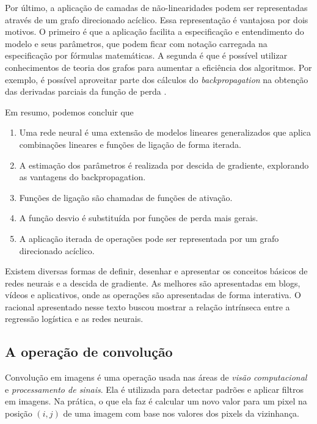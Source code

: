 \documentclass[12pt,]{report}
\providecommand{\tightlist}{%
  \setlength{\itemsep}{0pt}\setlength{\parskip}{0pt}}
\begin{document}
Por último, a aplicação de camadas de não-linearidades podem ser
representadas através de um grafo direcionado acíclico. Essa
representação é vantajosa por dois motivos. O primeiro é que a aplicação
facilita a especificação e entendimento do modelo e seus parâmetros, que
podem ficar com notação carregada na especificação por fórmulas
matemáticas. A segunda é que é possível utilizar conhecimentos de teoria
dos grafos para aumentar a eficiência dos algoritmos. Por exemplo, é
possível aproveitar parte dos cálculos do \emph{backpropagation} na
obtenção das derivadas parciais da função de perda
\citep{abadi2016tensorflow}.

Em resumo, podemos concluir que

\begin{enumerate}
\def\labelenumi{\arabic{enumi}.}
\tightlist
\item
  Uma rede neural é uma extensão de modelos lineares generalizados que
  aplica combinações lineares e funções de ligação de forma iterada.
\item
  A estimação dos parâmetros é realizada por descida de gradiente,
  explorando as vantagens do backpropagation.
\item
  Funções de ligação são chamadas de funções de ativação.
\item
  A função desvio é substituída por funções de perda mais gerais.
\item
  A aplicação iterada de operações pode ser representada por um grafo
  direcionado acíclico.
\end{enumerate}

Existem diversas formas de definir, desenhar e apresentar os conceitos
básicos de redes neurais e a descida de gradiente. As melhores são
apresentadas em blogs, vídeos e aplicativos, onde as operações são
apresentadas de forma interativa. O racional apresentado nesse texto
buscou mostrar a relação intrínseca entre a regressão logística e as
redes neurais.

\subsection{A operação de convolução}\label{a-operacao-de-convolucao}

Convolução em imagens é uma operação usada nas áreas de \emph{visão
computacional} e \emph{processamento de sinais}. Ela é utilizada para
detectar padrões e aplicar filtros em imagens. Na prática, o que ela faz
é calcular um novo valor para um pixel na posição \((i,j)\) de uma
imagem com base nos valores dos pixels da vizinhança.
\end{document}
